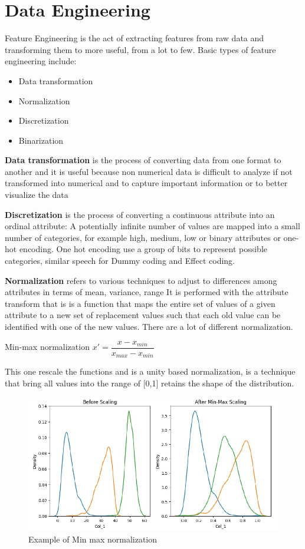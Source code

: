 \section{Data Engineering}
Feature Engineering is the act of extracting features from raw data and transforming them to more useful, from a lot to few. Basic types of feature engineering include:
\begin{itemize}
    \item Data transformation
    \item Normalization
    \item Discretization
    \item Binarization
\end{itemize}
\textbf{Data transformation} is the process of converting data from one format to another and it is useful because non numerical data is difficult to analyze if not transformed into numerical and to capture important information or to better visualize the data

\textbf{Discretization }is the process of converting a continuous attribute into an ordinal attribute: A potentially infinite number of values are mapped into a small number of categories, for example {high, medium, low} or binary attributes or one-hot encoding. One hot encoding use a group of bits to represent possible categories, similar speech for Dummy coding and Effect coding.

\textbf{Normalization} refers to various techniques to adjust to differences among attributes in terms of mean, variance, range It is performed with the attribute transform that is is a function that maps the entire set of values of a given attribute to a new set of replacement values such that each old value can be identified with one of the new values. There are a lot of different normalization.
\begin{center}
    Min-max normalization  $x'= \dfrac{x-x_{min}}{x_{max} - x_{min}}$
\end{center}
This one rescale the functions and is a unity based normalization, is a technique that bring all values into the range of [0,1] retains the shape of the distribution.
\begin{figure}[H]
    \centering
    \includegraphics[scale=0.5]{images/Data pre-process/MINMAX.png}
    \caption{Example of Min max normalization}
    \label{fig:enter-label}
\end{figure}

